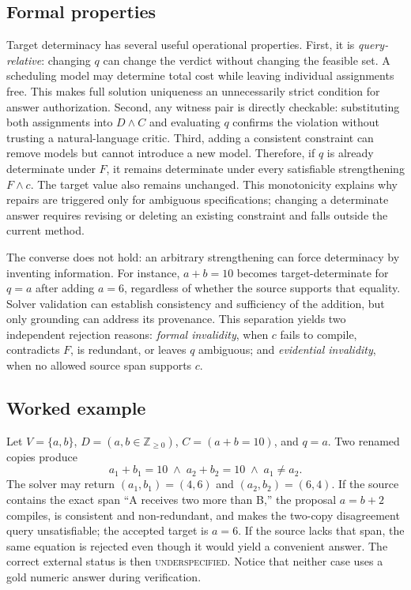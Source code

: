 \documentclass[sigconf,anonymous]{aamas}
\begin{document}
\subsection{Formal properties}
Target determinacy has several useful operational properties.  First, it is \emph{query-relative}: changing $q$ can change the verdict without changing the feasible set.  A scheduling model may determine total cost while leaving individual assignments free.  This makes full solution uniqueness an unnecessarily strict condition for answer authorization.  Second, any witness pair is directly checkable: substituting both assignments into $D\land C$ and evaluating $q$ confirms the violation without trusting a natural-language critic.  Third, adding a consistent constraint can remove models but cannot introduce a new model.  Therefore, if $q$ is already determinate under $F$, it remains determinate under every satisfiable strengthening $F\land c$.  The target value also remains unchanged.  This monotonicity explains why repairs are triggered only for ambiguous specifications; changing a determinate answer requires revising or deleting an existing constraint and falls outside the current method.

The converse does not hold: an arbitrary strengthening can force determinacy by inventing information.  For instance, $a+b=10$ becomes target-determinate for $q=a$ after adding $a=6$, regardless of whether the source supports that equality.  Solver validation can establish consistency and sufficiency of the addition, but only grounding can address its provenance.  This separation yields two independent rejection reasons: \emph{formal invalidity}, when $c$ fails to compile, contradicts $F$, is redundant, or leaves $q$ ambiguous; and \emph{evidential invalidity}, when no allowed source span supports $c$.

\subsection{Worked example}
Let $V=\{a,b\}$, $D=(a,b\in\mathbb{Z}_{\ge0})$, $C=(a+b=10)$, and $q=a$.  Two renamed copies produce
\[
a_1+b_1=10\;\land\;a_2+b_2=10\;\land\;a_1\ne a_2.
\]
The solver may return $(a_1,b_1)=(4,6)$ and $(a_2,b_2)=(6,4)$.  If the source contains the exact span ``A receives two more than B,'' the proposal $a=b+2$ compiles, is consistent and non-redundant, and makes the two-copy disagreement query unsatisfiable; the accepted target is $a=6$.  If the source lacks that span, the same equation is rejected even though it would yield a convenient answer.  The correct external status is then \textsc{underspecified}.  Notice that neither case uses a gold numeric answer during verification.
\end{document}
